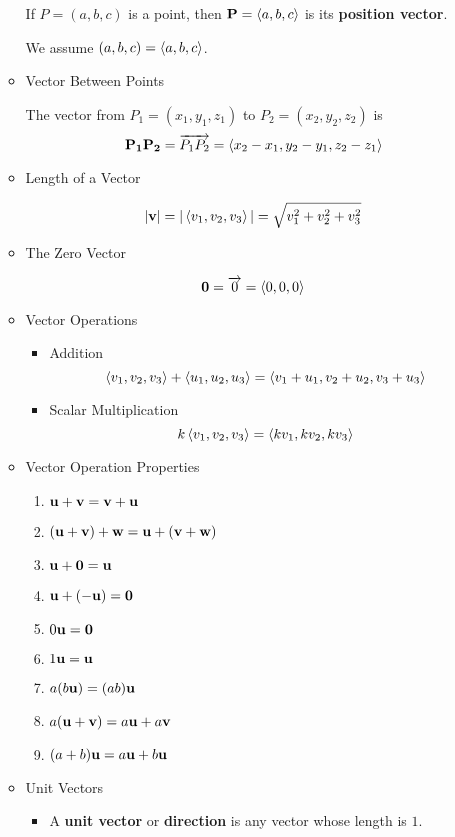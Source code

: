 \begin{itemize}
\begin{itemize}
    If $P=(a,b,c)$ is a point, then $\mathbf{P}=\left<a,b,c\right>$ is its \textbf{position vector}. 

    We assume $(a,b,c)=\left<a,b,c\right>$.

  \item Vector Between Points
  
  The vector from $P_1 = (x_1,y_1,z_1)$ to $P_2 = (x_2,y_2,z_2)$ is \[\mathbf{P_1P_2} = \overrightarrow{P_1P_2} = \left<x_2-x_1,y_2-y_1,z_2-z_1\right>\]
  
  \item Length of a Vector
  
    \[|\mathbf{v}| = |\left<v_1,v_2,v_3\right>| = \sqrt{v_1^2 + v_2^2 + v_3^2}\]
  
  \item The Zero Vector
  
  \[\mathbf{0} = \overrightarrow{0} = \left<0,0,0\right>\]
  
  \item Vector Operations
    \begin{itemize}
    \item Addition
      \[\left<v_1,v_2,v_3\right> + \left<u_1,u_2,u_3\right> = \left<v_1+u_1,v_2+u_2,v_3+u_3\right>\]
    \item Scalar Multiplication
      \[k\left<v_1,v_2,v_3\right> = \left<kv_1,kv_2,kv_3\right> \]
    \end{itemize}

  \item Vector Operation Properties
    \begin{enumerate}
    \item $\mathbf{u}+\mathbf{v} = \mathbf{v}+\mathbf{u}$
    \item $(\mathbf{u}+\mathbf{v})+\mathbf{w} = \mathbf{u}+(\mathbf{v}+\mathbf{w})$
    \item $\mathbf{u}+\mathbf{0} = \mathbf{u}$
    \item $\mathbf{u}+(-\mathbf{u}) = \mathbf{0}$
    \item $0\mathbf{u} = \mathbf{0}$
    \item $1\mathbf{u} = \mathbf{u}$
    \item $a(b\mathbf{u}) = (ab)\mathbf{u}$
    \item $a(\mathbf{u} + \mathbf{v}) = a\mathbf{u} + a\mathbf{v}$
    \item $(a+b)\mathbf{u} = a\mathbf{u} + b\mathbf{u}$
    \end{enumerate}

  \item Unit Vectors
    \begin{itemize}
    \item A \textbf{unit vector} or \textbf{direction} is any vector whose length is $1$.
    

\end{itemize}
\end{itemize}
\end{itemize}

